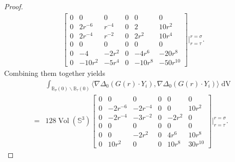 \documentclass[11pt,letterpaper]{amsart}
\DeclareMathOperator{\Vol}{Vol}
\DeclareMathOperator{\dvol}{dV}
\newcommand{\bB}{\mathbb{B}}
\newcommand{\bS}{\mathbb{S}}
\theoremstyle{definition}
\theoremstyle{remark}
\numberwithin{equation}{section}
\begin{document}
\begin{proof}
\begin{equation}
\begin{split}
\begin{bmatrix}
0 & 0 & 0 & 0 & 0& 0\\
0 & 2r^{-6} & r^{-4} & 0 & 2& 10r^2\\
0 & 2r^{-4} & r^{-2}& 0& 2r^2 & 10r^4\\
0 & 0 & 0 & 0 & 0& 0\\
0 & -4 & -2r^2 & 0 & -4r^6& -20r^8\\
0 & -10r^2 & -5r^4 & 0 & -10r^8& -50r^{10}
\end{bmatrix}\Big|_{r=\tau}^{r=\sigma}.
    \end{split}
\end{equation}
Combining them together yields
\begin{equation}
\begin{split}
    &\int_{\bB_{\sigma}(0)\backslash \bB_{\tau}(0)}\langle \nabla \Delta_0 (G(r)\cdot Y_i), \nabla \Delta_0(G(r)\cdot Y_i)\rangle \dvol\\
    =&128 \Vol(\bS^3) \begin{bmatrix}
0 & 0 & 0 & 0 & 0& 0\\
0 & -2r^{-6} & -2r^{-4} & 0 & 0& 10r^2\\
0 & -2r^{-4} & {-3r^{-2}}& 0& -2r^2 & 0\\
0 & 0 & 0 & 0 & 0& 0\\
0 & 0 & -2r^2 & 0 & 4r^6& 10r^8\\
0 & 10r^2 & 0 & 0 & 10r^8& {30r^{10}}
\end{bmatrix}\Bigg|_{r=\tau}^{r=\sigma}.
\end{split}
\end{equation}
\end{proof}
\end{document}
